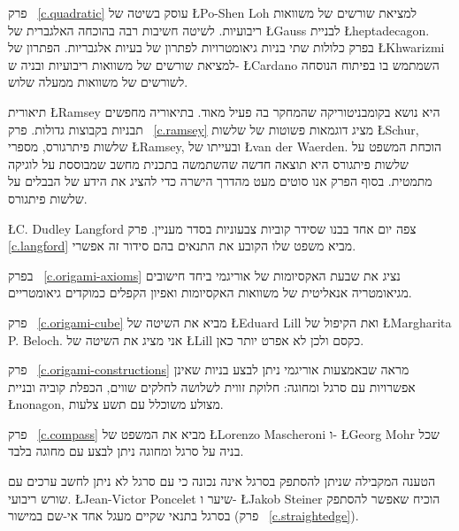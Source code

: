 
פרק~%
\ref{c.quadratic}
עוסק בשיטה של
\L{Po-Shen Loh}
למציאת שורשים של משוואות ריבועיות. לשיטה חשיבות רבה בהוכחה האלגברית של
\L{Gauss}
לבניית 
\L{heptadecagon}.
בפרק כלולות שתי בניות גיאומטרויות לפתרון של בעיות אלגבריות. הפתרון של
\L{Khwarizmi}
למציאת שורשים של משוואות ריבועיות ובניה ש-%
\L{Cardano}
השמתמש בו בפיתוח הנוסחה לשורשים של משוואות ממעלה שלוש.


תיאורית 
\L{Ramsey}
היא נושא בקומבניטוריקה שהמחקר בה פעיל מאוד. בתיאוריה מחפשים תבניות בקבוצות גדולות. פרק~%
\ref{c.ramsey}
מציג דוגמאות פשוטות של שלשות
\L{Schur},
שלשות פיתרגורס,
מספרי 
\L{Ramsey},
ובעייתו של
\L{van der Waerden}.
הוכחת המשפט על שלשות פיתגורס היא תוצאה חדשה שהשתמשה בתכנית מחשב שמבוססת על לוגיקה מתמטית. בסוף הפרק אנו סוטים מעט מהדרך הישרה כדי להציג את הידע של הבבלים על שלשות פיתגורס.

\L{C. Dudley Langford}
צפה יום אחד בבנו שסידר קוביות צבעוניות בסדר מעניין. 
פרק~%
\ref{c.langford}
מביא משפט שלו הקובע את התנאים בהם סידור זה אפשרי.



בפרק%
~\ref{c.origami-axioms}
נציג את שבעת האקסיומות של אוריגמי ביחד חישובים מגיאומטריה אנאליטית של משוואות האקסיומות ואפיון הקפלים כמוקדים גיאומטריים.

פרק~%
\ref{c.origami-cube}
מביא את השיטה של
\L{Eduard Lill}
ואת הקיפול של
\L{Margharita P. Beloch}.
אני מציג את השיטה של
\L{Lill}
כקסם ולכן לא אפרט יותר כאן.

פרק~%
\ref{c.origami-constructions}
מראה שבאמצעות אוריגמי ניתן לבצע בניות שאינן אפשרויות עם סרגל ומחוגה: חלוקת זווית לשלושה לחלקים שווים, הכפלת קוביה ובניית 
\L{nonagon},
מצולע משוכלל עם תשע צלעות.


פרק~%
\ref{c.compass}
מביא את המשפט של 
\L{Lorenzo Mascheroni}
ו-%
\L{Georg Mohr} 
שכל בניה על סרגל ומחוגה ניתן לבצע עם מחוגה בלבד.

הטענה המקבילה שניתן להסתפק בסרגל אינה נכונה כי עם סרגל לא ניתן לחשב ערכים עם שורש ריבועי.
\L{Jean-Victor Poncelet}
שיער ו-%
\L{Jakob Steiner}
הוכיח שאפשר להסתפק בסרגל בתנאי שקיים מעגל אחד אי-שם במישור (פרק~%
\ref{c.straightedge}).


